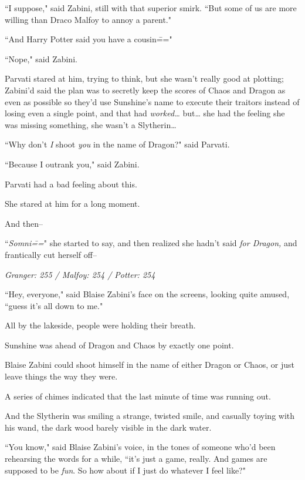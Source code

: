 ``I suppose," said Zabini, still with that superior smirk. ``But some of us are more willing than Draco Malfoy to annoy a parent."

``And Harry Potter said you have a cousin\==="

``Nope," said Zabini.

Parvati stared at him, trying to think, but she wasn't really good at plotting; Zabini'd said the plan was to secretly keep the scores of Chaos and Dragon as even as possible so they'd use Sunshine's name to execute their traitors instead of losing even a single point, and that had \emph{worked{\ldots}} but{\ldots} she had the feeling she was missing something, she wasn't a Slytherin{\ldots}

``Why don't \emph{I} shoot \emph{you} in the name of Dragon?" said Parvati.

``Because I outrank you," said Zabini.

Parvati had a bad feeling about this.

She stared at him for a long moment.

And then\---

``\emph{Somni\===}" she started to say, and then realized she hadn't said \emph{for Dragon,} and frantically cut herself off\---

\later

\emph{Granger: 255 / Malfoy: 254 / Potter: 254}

``Hey, everyone," said Blaise Zabini's face on the screens, looking quite amused, ``guess it's all down to me."

All by the lakeside, people were holding their breath.

Sunshine was ahead of Dragon and Chaos by exactly one point.

Blaise Zabini could shoot himself in the name of either Dragon or Chaos, or just leave things the way they were.

A series of chimes indicated that the last minute of time was running out.

And the Slytherin was smiling a strange, twisted smile, and casually toying with his wand, the dark wood barely visible in the dark water.

``You know," said Blaise Zabini's voice, in the tones of someone who'd been rehearsing the words for a while, ``it's just a game, really. And games are supposed to be \emph{fun}. So how about if I just do whatever I feel like?"

